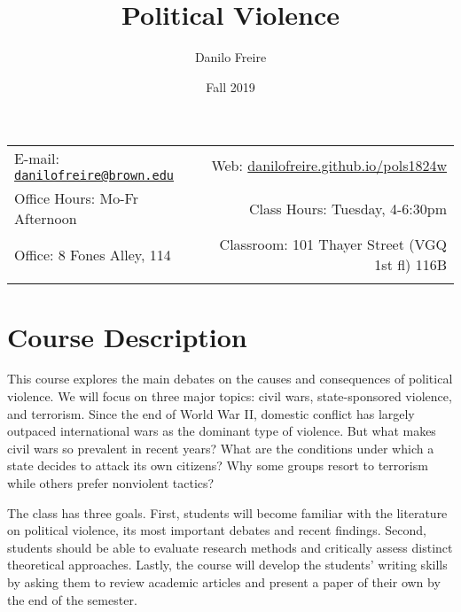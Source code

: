 \documentclass[12pt,]{article}
\title{Political Violence}
\author{Danilo Freire}
\date{Fall 2019}
\begin{document}
  

		\maketitle
		
	
		\thispagestyle{firststyle}



	\noindent \begin{tabular*}{\textwidth}{ @{\extracolsep{\fill}} lr @{\extracolsep{\fill}}}


E-mail: \href{mailto:danilofreire@brown.edu}{\nolinkurl{danilofreire@brown.edu}} & Web: \href{http://danilofreire.github.io/pols1824w}{danilofreire.github.io/pols1824w}\\
Office Hours: Mo-Fr Afternoon  &  Class Hours: Tuesday, 4-6:30pm\\
Office: 8 Fones Alley, 114  & Classroom: 101 Thayer Street (VGQ 1st fl) 116B\\
	&  \\
	\hline
	\end{tabular*}
	
\vspace{2mm}
	


\hypertarget{course-description}{%
\section{Course Description}\label{course-description}}

This course explores the main debates on the causes and consequences of
political violence. We will focus on three major topics: civil wars,
state-sponsored violence, and terrorism. Since the end of World War II,
domestic conflict has largely outpaced international wars as the
dominant type of violence. But what makes civil wars so prevalent in
recent years? What are the conditions under which a state decides to
attack its own citizens? Why some groups resort to terrorism while
others prefer nonviolent tactics?

The class has three goals. First, students will become familiar with the
literature on political violence, its most important debates and recent
findings. Second, students should be able to evaluate research methods
and critically assess distinct theoretical approaches. Lastly, the
course will develop the students' writing skills by asking them to
review academic articles and present a paper of their own by the end of
the semester.
\end{document}
